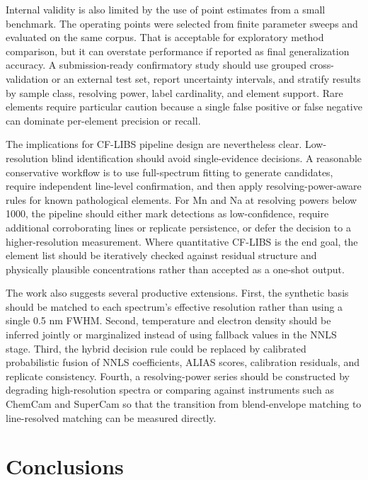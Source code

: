 \documentclass[preprint,12pt,authoryear]{elsarticle}
\begin{document}
Internal validity is also limited by the use of point estimates from a small benchmark. The operating points were selected from finite parameter sweeps and evaluated on the same corpus. That is acceptable for exploratory method comparison, but it can overstate performance if reported as final generalization accuracy. A submission-ready confirmatory study should use grouped cross-validation or an external test set, report uncertainty intervals, and stratify results by sample class, resolving power, label cardinality, and element support. Rare elements require particular caution because a single false positive or false negative can dominate per-element precision or recall.

The implications for CF-LIBS pipeline design are nevertheless clear. Low-resolution blind identification should avoid single-evidence decisions. A reasonable conservative workflow is to use full-spectrum fitting to generate candidates, require independent line-level confirmation, and then apply resolving-power-aware rules for known pathological elements. For Mn and Na at resolving powers below 1000, the pipeline should either mark detections as low-confidence, require additional corroborating lines or replicate persistence, or defer the decision to a higher-resolution measurement. Where quantitative CF-LIBS is the end goal, the element list should be iteratively checked against residual structure and physically plausible concentrations rather than accepted as a one-shot output.

The work also suggests several productive extensions. First, the synthetic basis should be matched to each spectrum's effective resolution rather than using a single 0.5 nm FWHM. Second, temperature and electron density should be inferred jointly or marginalized instead of using fallback values in the NNLS stage. Third, the hybrid decision rule could be replaced by calibrated probabilistic fusion of NNLS coefficients, ALIAS scores, calibration residuals, and replicate consistency. Fourth, a resolving-power series should be constructed by degrading high-resolution spectra or comparing against instruments such as ChemCam and SuperCam so that the transition from blend-envelope matching to line-resolved matching can be measured directly.

\section{Conclusions}
\end{document}
